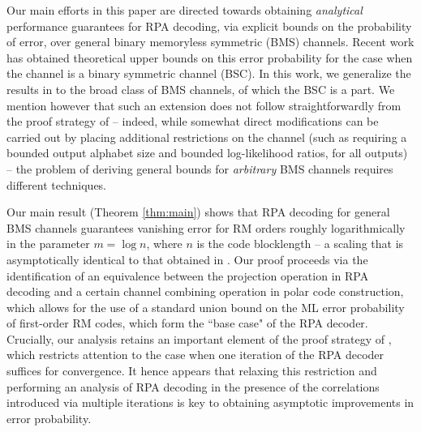 \documentclass[conference,letterpaper]{IEEEtran}
\begin{document}
Our main efforts in this paper are directed towards obtaining \emph{analytical} performance guarantees for RPA decoding, via explicit bounds on the probability of error, over general binary memoryless symmetric (BMS) channels. Recent work \cite{rpa-analysis-isit} has obtained theoretical upper bounds on this error probability for the case when the channel is a binary symmetric channel (BSC). In this work, we generalize the results in \cite{rpa-analysis-isit} to the broad class of BMS channels, of which the BSC is a part. We mention however that such an extension does not follow straightforwardly from the proof strategy of \cite{rpa-analysis-isit} -- indeed, while somewhat direct modifications can be carried out by placing additional restrictions on the channel (such as requiring a bounded output alphabet size and bounded log-likelihood ratios, for all outputs) -- the problem of deriving general bounds for \emph{arbitrary} BMS channels requires different techniques. 

Our main result (Theorem \ref{thm:main}) shows that RPA decoding for general BMS channels guarantees vanishing error for RM orders roughly logarithmically in the parameter $m = \log n$, where $n$ is the code blocklength -- a scaling that is asymptotically identical to that obtained in \cite{rpa-analysis-isit}. Our proof proceeds via the identification of an equivalence between the projection operation in RPA decoding and a certain channel combining operation in polar code construction, which allows for the use of a standard union bound on the ML error probability of first-order RM codes, which form the ``base case" of the RPA decoder. Crucially, our analysis retains an important element of the proof strategy of \cite{rpa-analysis-isit}, which restricts attention to the case when one iteration of the RPA decoder suffices for convergence. It hence appears that relaxing this restriction and performing an analysis of RPA decoding in the presence of the correlations introduced via multiple iterations is key to obtaining asymptotic improvements in error probability.

\end{document}
